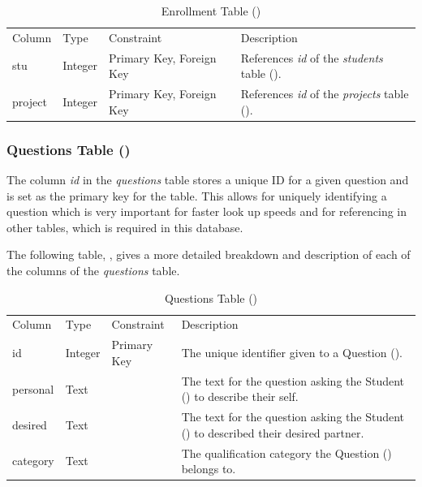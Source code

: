 \documentclass[12pt,letterpaper]{article}
\begin{document}
\begin{table}[H]
	\caption{Enrollment Table ()} 
	\begin{tabu} to \textwidth {l l X X[4]}
		\tableheader{}Column & Type & Constraint & Description \\
		stu     & Integer & Primary Key,\newline
		                    Foreign Key          & References \textit{id} of the \textit{students} table (). \\
		project & Integer & Primary Key,\newline
		                    Foreign Key          & References \textit{id} of the \textit{projects} table (). \\
	\end{tabu}
\end{table}

\subsubsection*{Questions Table ()}
The column \textit{id} in the \textit{questions} table stores a unique ID for a given question and is set as the primary key for the table. This allows for uniquely identifying a question which is very important for faster look up speeds and for referencing in other tables, which is required in this database.

The following table, , gives a more detailed breakdown and description of each of the columns of the \textit{questions} table.

\begin{table}[H]
	\caption{Questions Table ()} 
	\begin{tabu} to \textwidth {l l l X}
		\tableheader{}Column & Type & Constraint & Description \\
		id       & Integer & Primary Key & The unique identifier given to a Question (). \\
		personal & Text    &             & The text for the question asking the Student () to describe their self. \\
		desired  & Text    &             & The text for the question asking the Student () to described their desired partner. \\
		category & Text    &             & The qualification category the Question () belongs to. \\
	\end{tabu}
\end{table}
\end{document}
